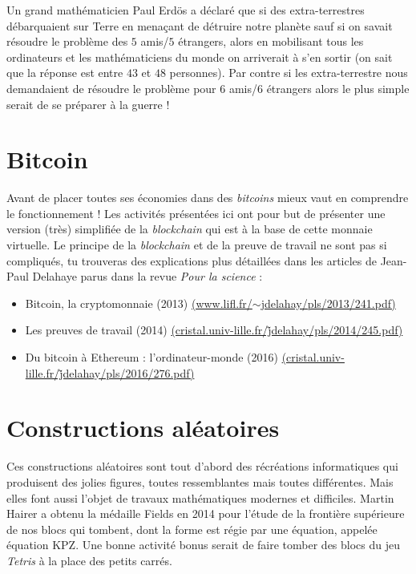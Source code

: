 \documentclass[11pt,class=report,crop=false]{standalone}
\begin{document}
Un grand mathématicien Paul Erd\"os a déclaré que si des extra-terrestres débarquaient sur Terre en menaçant de détruire notre planète sauf si on savait résoudre le problème des $5$ amis/$5$ étrangers, alors en mobilisant tous les ordinateurs et les mathématiciens du monde on arriverait à s'en sortir (on sait que la réponse est entre $43$ et $48$ personnes). Par contre si les extra-terrestre nous demandaient de résoudre le problème pour $6$ amis/$6$ étrangers alors le plus simple serait de se préparer à la guerre !


\section{Bitcoin}

Avant de placer toutes ses économies dans des \emph{bitcoins} mieux vaut en comprendre le fonctionnement ! Les activités présentées ici ont pour but de présenter une version (très) simplifiée de la \emph{blockchain} qui est à la base de cette monnaie virtuelle.
Le principe de la \emph{blockchain} et de la preuve de travail ne sont pas si compliqués, tu trouveras des explications plus détaillées dans les articles de Jean-Paul Delahaye parus dans la revue \emph{Pour la science} :
\begin{itemize}
  \item Bitcoin, la cryptomonnaie (2013) 
  \href{http://www.lifl.fr/~jdelahay/pls/2013/241.pdf}{\small (www.lifl.fr/$\sim$jdelahay/pls/2013/241.pdf)}
  \item Les preuves de travail (2014) 
  \href{http://cristal.univ-lille.fr/$\sim$jdelahay/pls/2014/245.pdf}{\small (cristal.univ-lille.fr/\~jdelahay/pls/2014/245.pdf)}
  \item Du bitcoin à Ethereum : l’ordinateur-monde (2016)
  \href{http://cristal.univ-lille.fr/$\sim$jdelahay/pls/2016/276.pdf}{\small (cristal.univ-lille.fr/\~jdelahay/pls/2016/276.pdf)}
\end{itemize}



\section{Constructions aléatoires}

Ces constructions aléatoires sont tout d'abord des récréations informatiques qui produisent des jolies figures, toutes ressemblantes mais toutes différentes. Mais elles font aussi l'objet de travaux mathématiques modernes et difficiles. Martin Hairer a obtenu la médaille Fields en 2014 pour l'étude de la frontière supérieure de nos blocs qui tombent, dont la forme est régie par une équation, appelée \og{}équation KPZ\fg{}.
Une bonne activité bonus serait de faire tomber des blocs du jeu \emph{Tetris} à la place des petits carrés.
\end{document}

